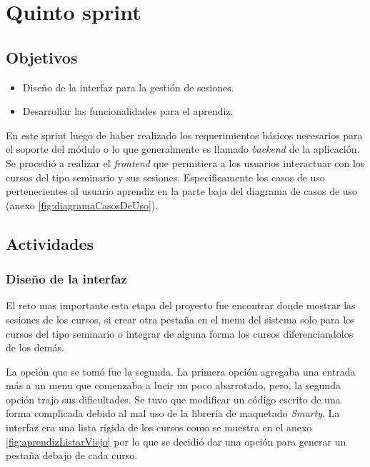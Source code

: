 \section{Quinto sprint} %
\label{sec:quinto_sprint}

\subsection{Objetivos}

\begin{itemize}
	\item Diseño de la interfaz para la gestión de sesiones.
	\item Desarrollar las funcionalidades para el aprendiz.
\end{itemize}

En este sprint luego de haber realizado los requerimientos básicos necesarios para el soporte del módulo o lo que generalmente es llamado \emph{backend} de la aplicación. Se procedió a realizar el \emph{frontend} que permitiera a los usuarios interactuar con los cursos del tipo seminario y sus sesiones. Especificamente los casos de uso pertenecientes al usuario aprendiz en la parte baja del diagrama de casos de uso (anexo \ref{fig:diagramaCasosDeUso}).

\subsection{Actividades} %
\label{sub:actividades5}

\subsubsection{Diseño de la interfaz}
El reto mas importante esta etapa del proyecto fue encontrar donde mostrar las sesiones de los cursos, si crear otra pestaña en el menu del sistema solo para los cursos del tipo seminario o integrar de alguna forma los cursos diferenciandolos de los demás.

La opción que se tomó fue la segunda. La primera opción agregaba una entrada más a un menu que comenzaba a lucir un poco abarrotado, pero, la segunda opción trajo sus dificultades. Se tuvo que modificar un código escrito de una forma complicada debido al mal uso de la librería de maquetado \emph{Smarty}. La interfaz era una lista rígida de los cursos como se muestra en el anexo \ref{fig:aprendizListarViejo} por lo que se decidió dar una opción para generar un pestaña debajo de cada curso.

